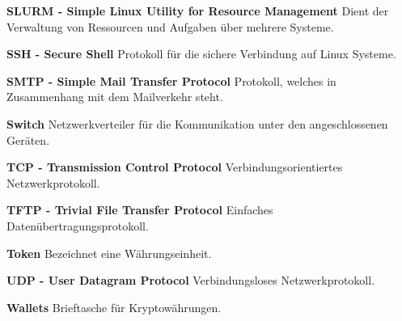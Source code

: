 \textbf{SLURM - Simple Linux Utility for Resource Management}\newline
Dient der Verwaltung von Ressourcen und Aufgaben über mehrere Systeme.

\textbf{SSH - Secure Shell}\newline
Protokoll für die sichere Verbindung auf Linux Systeme.

\textbf{SMTP - Simple Mail Transfer Protocol}\newline
Protokoll, welches in Zusammenhang mit dem Mailverkehr steht.

\textbf{Switch}\newline
Netzwerkverteiler für die Kommunikation unter den angeschlossenen Geräten.

\textbf{TCP - Transmission Control Protocol}\newline
Verbindungsorientiertes Netzwerkprotokoll.

\textbf{TFTP - Trivial File Transfer Protocol}\newline
Einfaches Datenübertragungsprotokoll.

\textbf{Token}\newline
Bezeichnet eine Währungseinheit.

\textbf{UDP - User Datagram Protocol}\newline
Verbindungsloses Netzwerkprotokoll.

\textbf{Wallets}\newline
Brieftasche für Kryptowährungen.



